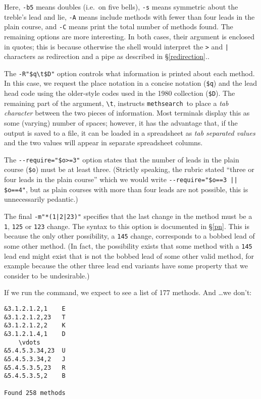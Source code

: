 \documentclass[a4paper,11pt,oneside]{book}
\makeatletter
\def\textitidx#1{\textit{#1}\index{#1}}
\newcommand{\oi}[1]{\index{#1@{\hspace*{-\optwidth}\texttt{-}\texttt{#1}}}}
\newcommand{\fspec}[1]{\index{#1@{\hspace*{-\fspecwidth}\texttt{\$#1}}}}
\def\methsearch{\texttt{meth\-search}}
\newcommand{\sref}[1]{\hyperref[#1]{\S\ref{#1}}}
\makeatother
\begin{document}
Here, \verb+-b5+ means doubles (i.e.\ on five bells), \verb+-s+ means 
symmetric about the treble's lead and lie, \verb+-A+ means include methods
with fewer than four leads in the plain course,\oi{A} 
and \verb+-C+ means print the total number of methods found.\oi{C}
The remaining options are more interesting.  In both cases, their argument
is enclosed in quotes;  this is because otherwise the shell would interpret
the \verb+>+ and \verb+|+ characters as redirection and a pipe as described
in \sref{redirection}..

The \verb+-R"$q\t$D"+\oi{R} option controls what information is printed 
about each method.  In this case, we request the place notation in a 
concise notation (\verb+$q+)\fspec{q} and the lead head code using the 
older-style codes used in the 1980 collection (\verb+$D+)\fspec{D}.  
The remaining part of the argument, \verb+\t+, instructs \methsearch\ to 
place a \textitidx{tab character} between the two pieces of information.
Most terminals display this as some (varying) number of spaces; however, 
it has the advantage that, if the output is saved to a file, it can 
be loaded in a spreadsheet as 
\textit{tab separated values} and the two values will appear in 
separate spreadsheet columns.

The \verb+--require="$o>=3"+ option states that the number of leads in
the plain course (\verb+$o+)\fspec{o} must be at least three.  
(Strictly speaking, the rubric stated ``three or four leads in the 
plain course'' which we would write \verb+--require="$o==3 || $o==4"+, 
but as plain courses with more than four leads are not possible, 
this is unnecessarily pedantic.)

The final \verb+-m"*(1|2|23)"+\oi{m} specifies that the last change
in the method must be a \verb+1+, \verb+125+ or \verb+123+ change.
The syntax to this option is documented in \sref{pn}.
This is because the only other possibility, a \verb+145+ change, corresponds
to a bobbed lead of some other method.  (In fact, the possibility exists that
some method with a \verb+145+ lead end might exist that is not the bobbed
lead of some other valid method, for example because the other three lead
end variants have some property that we consider to be undesirable.)

If we run the command, we expect to see a list of 177 methods. 
And \ldots we don't:

\begin{Verbatim}[obeytabs=true,commandchars=\\\{\}]
&3.1.2.1.2,1	E
&3.1.2.1.2,23	T
&3.1.2.1.2,2	K
&3.1.2.1.4,1	D
	\vdots
&5.4.5.3.34,23	U
&5.4.5.3.34,2	J
&5.4.5.3.5,23	R
&5.4.5.3.5,2	B

Found 258 methods
\end{Verbatim}
\end{document}
